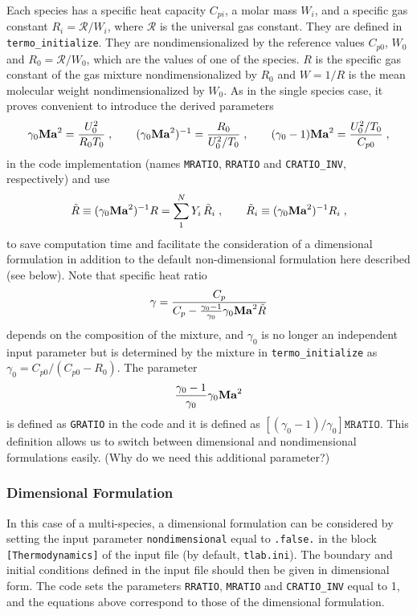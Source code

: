 Each species has a specific heat capacity $C_{pi}$, a molar mass $W_i$, and a specific gas constant $R_i=\mathcal{R}/W_i$, where  $\mathcal{R}$ is the universal gas constant. They are defined in \texttt{termo\_initialize}. They are nondimensionalized by the reference values $C_{p0}$, $W_0$ and $R_0=\mathcal{R}/W_0$, which are the values of one of the species. $R$ is the specific gas constant of the gas mixture nondimensionalized by $R_0$ and $W=1/R$ is the mean molecular weight nondimensionalized by $W_0$. As in the single species case, it proves convenient to introduce the derived parameters
\begin{equation}
    \gamma_0\mathrm{\bf Ma}^2=\frac{U_0^2}{R_0T_0}\;,\qquad (\gamma_0\mathrm{\bf Ma}^2)^{-1}=\frac{R_0}{U^2_0/T_0}\;,\qquad (\gamma_0-1)\mathrm{\bf Ma}^2 =\frac{U_0^2/T_0}{C_{p0}} \;,
\end{equation}
in the code implementation (names \texttt{MRATIO}, \texttt{RRATIO} and \texttt{CRATIO\_INV}, respectively) and use 
\begin{equation}
    \tilde{R}\equiv (\gamma_0\mathrm{\bf Ma}^2)^{-1}R=\sum_1^NY_i\,\tilde{R}_i\;,\qquad\tilde{R}_i\equiv (\gamma_0\mathrm{\bf Ma}^2)^{-1}R_i
    \;,
\end{equation}
to save computation time and facilitate the consideration of a dimensional formulation in addition to the default non-dimensional formulation here described (see below). Note that specific heat ratio
\begin{equation}
    \gamma=\frac{C_p}{C_p-\frac{\gamma_0-1}{\gamma_0}\gamma_0\mathrm{\bf Ma}^2\tilde{R}}
\end{equation}
depends on the composition of the mixture, and $\gamma_0$ is no longer an independent input parameter but is determined by the mixture in \texttt{termo\_initialize} as $\gamma_0=C_{p0}/(C_{p0}-R_0)$. The parameter
\begin{equation}
    \frac{\gamma_0-1}{\gamma_0}\gamma_0\mathrm{\bf Ma}^2
\end{equation}
is defined as \texttt{GRATIO} in the code and it is defined as $[(\gamma_0-1)/\gamma_0]\texttt{MRATIO}$. This definition allows us to switch between dimensional and nondimensional formulations easily. (Why do we need this additional parameter?)


\subsubsection{Dimensional Formulation}

In this case of a multi-species, a dimensional formulation can be considered by setting the input parameter \texttt{nondimensional} equal to \texttt{.false.} in the block \texttt{[Thermodynamics]} of the input file (by default, \texttt{tlab.ini}). The boundary and initial conditions defined in the input file should then be given in dimensional form. The code sets the parameters \texttt{RRATIO}, \texttt{MRATIO} and \texttt{CRATIO\_INV} equal to 1, and the equations above correspond to those of the dimensional formulation. %

